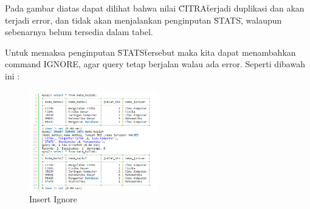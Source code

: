 	Pada gambar diatas dapat dilihat bahwa nilai \"CITRA\" terjadi duplikasi dan akan terjadi error, dan tidak akan menjalankan penginputan \"STATS\", walaupun sebenarnya belum tersedia dalam tabel.
	
	Untuk memaksa penginputan \"STATS\" tersebut  maka kita dapat menambahkan command IGNORE, agar query tetap berjalan walau ada error. Seperti dibawah ini :
	
		\begin{figure}[ht]
			\centerline{\includegraphics[width=0.5\textwidth]{figures/insert7.png}}
			\caption{Insert Ignore}
			\label{insert7}
			\end{figure}
	
\cite{sofwan2003belajar}
\cite{kadir2010mudah}
